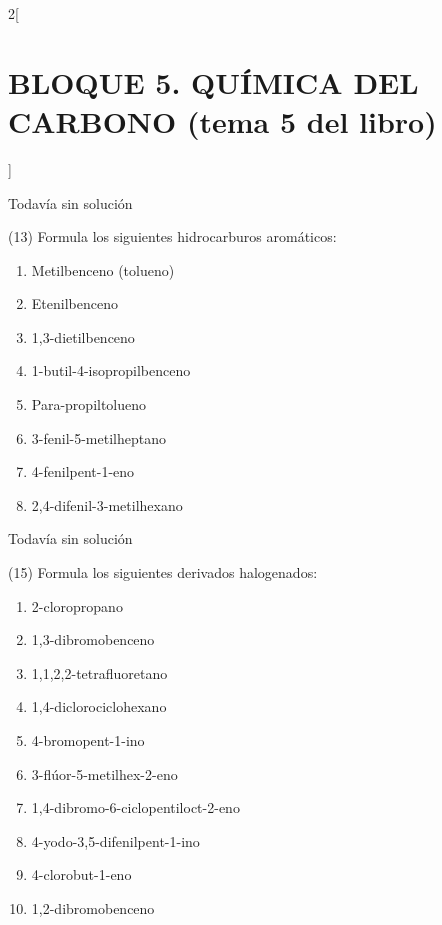 \documentclass[10pt]{article}
\begin{document}
\begin{multicols}{2}[
  \section{BLOQUE 5. QUÍMICA DEL CARBONO (tema 5 del libro)}
  ]
\begin{solution}[print=false]
  Todavía sin solución
\end{solution}




\begin{exercise}[
    tags    = {},
    topics  = {química,química básica},
    source  = {FQ 1B MGH 2016, p85, e26},
  ]

  (13) Formula los siguientes hidrocarburos aromáticos:
  \begin{enumerate}
    \item Metilbenceno (tolueno)
    \item Etenilbenceno
    \item 1,3-dietilbenceno
    \item 1-butil-4-isopropilbenceno
    \item Para-propiltolueno
    \item 3-fenil-5-metilheptano
    \item 4-fenilpent-1-eno
    \item 2,4-difenil-3-metilhexano
  \end{enumerate}
\end{exercise}

\begin{solution}[print=false]
  Todavía sin solución
\end{solution}




\begin{exercise}[
    tags    = {},
    topics  = {química,química básica},
    source  = {FQ 1B MGH 2016, p85, e26},
  ]

  (15) Formula los siguientes derivados halogenados:
  \begin{enumerate}
    \item 2-cloropropano
    \item 1,3-dibromobenceno
    \item 1,1,2,2-tetrafluoretano
    \item 1,4-diclorociclohexano
    \item 4-bromopent-1-ino
    \item 3-flúor-5-metilhex-2-eno
    \item 1,4-dibromo-6-ciclopentiloct-2-eno
    \item 4-yodo-3,5-difenilpent-1-ino
    \item 4-clorobut-1-eno
    \item 1,2-dibromobenceno
  \end{enumerate}
\end{exercise}


\end{multicols}
\end{document}
